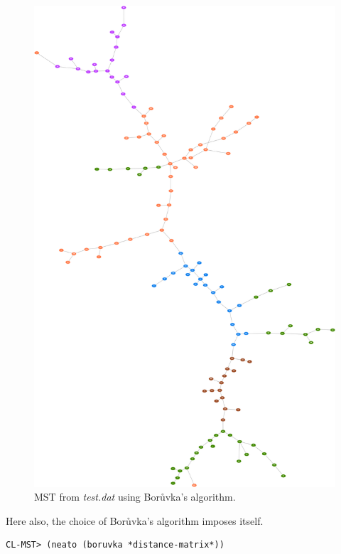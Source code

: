 \newpage 
\begin{figure}[H]
	\begin{center}
		\includegraphics[width=\columnwidth-1cm]{img/mst1}
		\caption{MST from \textsl{test.dat} using Bor\r{u}vka's algorithm.}
		\label{fig:mst1}
	\end{center}
\end{figure}

Here also, the choice of Bor\r{u}vka's algorithm imposes itself.

\begin{lstlisting}[language=Lisp]
CL-MST> (neato (boruvka *distance-matrix*))
\end{lstlisting}

